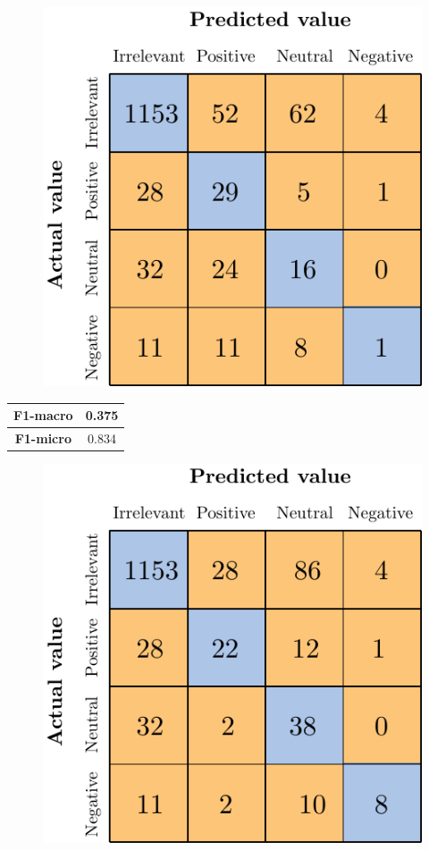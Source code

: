 \begin{figure}[H]
	\centering
	\includegraphics[scale=1]{figures/conf_matrices/ita_cascade_svm/ita_cascade_svm_tst.pdf}
	\label{fig:ita_cascade_svm_tst}
\end{figure}

\begin{center}
	\begin{tabular}{ | c | c | } 
		\hline
		\textbf{F1-macro} & 0.375 \\
		\hline
		\textbf{F1-micro} & 0.834 \\ 
		\hline
	\end{tabular}
\end{center}


\begin{figure}[H]
	\centering
	\includegraphics[scale=1]{figures/conf_matrices/ita_cascade_bpef/ita_cascade_bpef_tst.pdf}
	\label{fig:ita_cascade_bpef_tst}
\end{figure}


